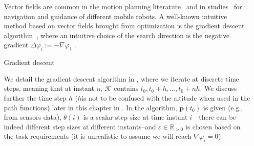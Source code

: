 Vector fields are common in the motion planning literature~\citep{choset2005principles,lavalle2006planning} and in studies~\citep{lindemann2005smoothly,gonccalves2010vector,panagou2014motion,zhou2014vector,kapitanyuk2017guiding,de2017guidance} for navigation and guidance of different mobile robots. A well-known intuitive method based on vector fields brought from optimization is the gradient descent algorithm~\citep{choset2005principles,bryson1975applied}, where an intuitive choice of the search direction is the negative gradient $\Delta \varphi_i:=-\nabla\varphi_i$~\citep{boyd2004convex}.
\begin{algorithm}[h!] %

  \DontPrintSemicolon
  \vspace{.8ex}

  \vspace{1.6ex}

  \caption{Gradient descent}
  \label{algo:grad-desc}
\end{algorithm}
We detail the gradient descent algorithm in , where we iterate at discrete time steps, meaning that at instant $n$, $\mathcal{K}$ contains $t_0,t_0+h,\dots,t_0+nh$. We discuss further the time step $h$ ($h$is not to be confused with the altitude when used in the path functions) later in this chapter in . In the algorithm, $\mathbf{p}(t_0)$ is given (e.g., from sensors data), $\theta(i)$ is a scalar step size at time instant $i$~\citep{choset2005principles}--there can be indeed different step sizes at different instants--and $\varepsilon\in\mathbb{R}_{>0}$ is chosen based on the task requirements (it is unrealistic to assume we will reach $\nabla\varphi_i=0$).

